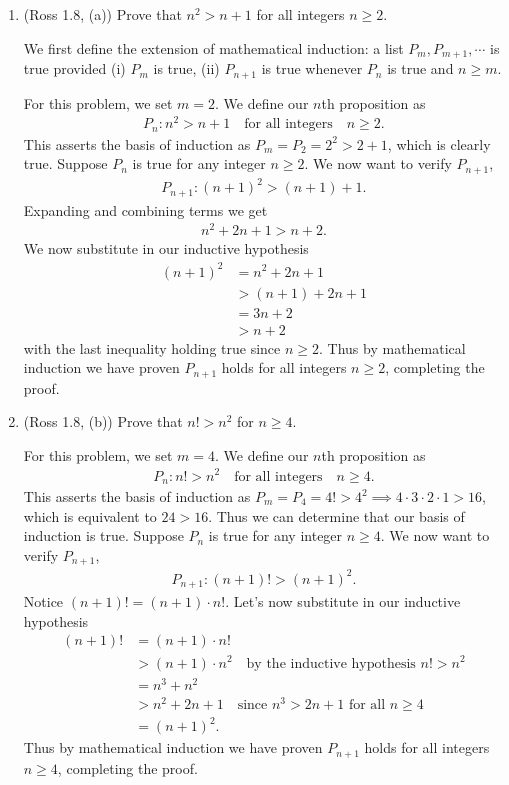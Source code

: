 \documentclass [10pt]{article}
\newcommand{\jg}[1]{{\color{blue} #1}}
\begin{document}
\begin{enumerate}

\item (Ross 1.8, (a)) Prove that $n^2> n+1$ for all integers $n\geq 2$.

\jg{
We first define the extension of mathematical induction: a list $P_m, P_{m+1}, \cdots$ is true provided (i) $P_m$ is true, (ii) $P_{n+1}$ is true whenever $P_n$ is true and $n \geq m$. 

For this problem, we set $m = 2$. We define our $n$th proposition as 
\begin{align*}
    P_n : n^2 > n+1 \quad \text{for all integers} \quad  n \geq 2.  
\end{align*}
This asserts the basis of induction as $P_m = P_2 = 2^2 > 2 + 1$, which is clearly true. Suppose $P_n$ is true for any integer $n \geq 2$. We now want to verify $P_{n+1}$, 
\begin{align*}
    P_{n+1} : (n+1)^2 > (n+1) + 1.
\end{align*}
Expanding and combining terms we get 
\begin{align*}
    n^2 + 2n + 1 > n + 2. 
\end{align*}
We now substitute in our inductive hypothesis 
\begin{align*}
    (n+1)^2 &= n^2 + 2n + 1 \\
            &> (n+1) + 2n + 1 \\
            &= 3n + 2 \\
            &> n + 2 
\end{align*}
with the last inequality holding true since $n \geq 2$. Thus by mathematical induction we have proven $P_{n+1}$ holds for all integers $n \geq 2$, completing the proof. 
}
\clearpage
\item (Ross 1.8, (b)) Prove that $n! > n^2$ for $n\geq 4$.

\jg{
For this problem, we set $m=4$. We define our $n$th proposition as 
\begin{align*}
    P_n : n! > n^2 \quad \text{for all integers} \quad n \geq 4. 
\end{align*}
This asserts the basis of induction as $P_m = P_4 = 4! > 4^2 \implies 4 \cdot 3 \cdot 2 \cdot 1 > 16$, which is equivalent to $24 > 16$. Thus we can determine that our basis of induction is true. Suppose $P_n$ is true for any integer $n \geq 4$. We now want to verify $P_{n+1}$, 
\begin{align*}
    P_{n+1} : (n + 1)! > (n+1)^2.
\end{align*}
Notice $(n+1)! = (n+1) \cdot n!$. Let's now substitute in our inductive hypothesis
\begin{align*}
    (n+1)! &= (n+1) \cdot n! \\
           &> (n+1) \cdot n^2 \quad \text{by the inductive hypothesis $n! > n^2$} \\
           &= n^3 + n^2  \\
           &> n^2 + 2n + 1 \quad \text{since $n^3 > 2n + 1$ for all $n \geq 4$} \\
           &= (n+1)^2. 
\end{align*}
Thus by mathematical induction we have proven $P_{n+1}$ holds for all integers $n\geq4$, completing the proof. 

}
\end{enumerate}
\end{document}
